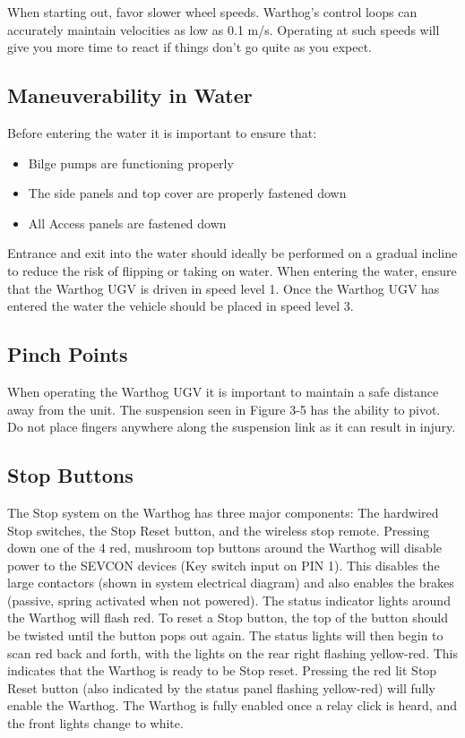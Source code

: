 \documentclass[]{clearpath-latex/clearpath-manual}
\begin{document}
When starting out, favor slower wheel speeds. Warthog's control loops can accurately maintain velocities as low as 0.1 m/s. Operating at such speeds will give you more time to react if things don’t go quite as you expect.

\subsection{Maneuverability in Water}

Before entering the water it is important to ensure that:

\begin{itemize}[nolistsep]
  \item Bilge pumps are functioning properly
  \item The side panels and top cover are properly fastened down
  \item All Access panels are fastened down
\end{itemize}

Entrance and exit into the water should ideally be performed on a gradual incline to reduce the risk of flipping or taking on water. When entering the water, ensure that the Warthog UGV is driven in speed level 1. Once the Warthog UGV has entered the water the vehicle should be placed in speed level 3.

\subsection{Pinch Points}

When operating the Warthog UGV it is important to maintain a safe distance away from the unit. The suspension seen in Figure 3-5 has the ability to pivot.  Do not place fingers anywhere along the suspension link as it can result in injury.

\subsection{Stop Buttons}

The Stop system on the Warthog has three major components: The hardwired Stop switches, the Stop Reset button, and the wireless stop remote. Pressing down one of the 4 red, mushroom top buttons around the Warthog will disable power to the SEVCON devices (Key switch input on PIN 1). This disables the large contactors (shown in system electrical diagram) and also enables the brakes (passive, spring activated when not powered). The status indicator lights around the Warthog will flash red. To reset a Stop button, the top of the button should be twisted until the button pops out again. The status lights will then begin to scan red back and forth, with the lights on the rear right flashing yellow-red. This indicates that the Warthog is ready to be Stop reset. Pressing the red lit Stop Reset button (also indicated by the status panel flashing yellow-red) will fully enable the Warthog. The Warthog is fully enabled once a relay click is heard, and the front lights change to white.
\end{document}
